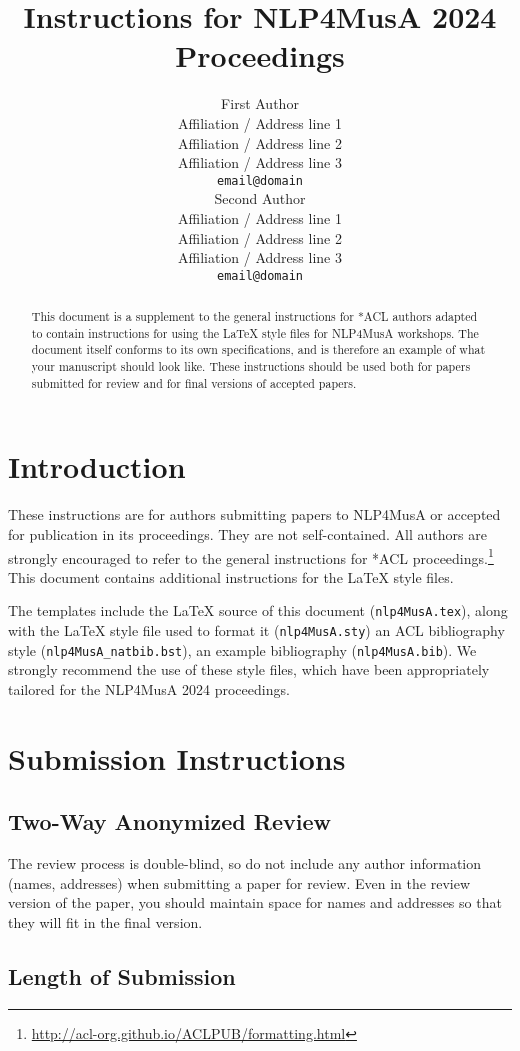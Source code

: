 \documentclass[11pt]{article}
\title{Instructions for NLP4MusA 2024 Proceedings}
\author{First Author \\
  Affiliation / Address line 1 \\
  Affiliation / Address line 2 \\ 
  Affiliation / Address line 3 \\
  \texttt{email@domain} \\\And
  Second Author \\
  Affiliation / Address line 1 \\
  Affiliation / Address line 2 \\
  Affiliation / Address line 3 \\
  \texttt{email@domain} \\}
\begin{document}
\maketitle
\begin{abstract}
This document is a supplement to the general instructions for *ACL authors adapted to contain instructions for using the \LaTeX{} style files for NLP4MusA workshops.
The document itself conforms to its own specifications, and is therefore an example of what your manuscript should look like.
These instructions should be used both for papers submitted for review and for final versions of accepted papers. 
\end{abstract}

\section{Introduction}

These instructions are for authors submitting papers to NLP4MusA or accepted for publication in its proceedings.
They are not self-contained. All authors are strongly encouraged to refer to the general instructions for *ACL proceedings.\footnote{\url{http://acl-org.github.io/ACLPUB/formatting.html}}
This document contains additional instructions for the \LaTeX{} style files.

The templates include the \LaTeX{} source of this document (\texttt{nlp4MusA.tex}),
along with the \LaTeX{} style file used to format it (\texttt{nlp4MusA.sty})
an ACL bibliography style (\texttt{nlp4MusA\_natbib.bst}),
an example bibliography (\texttt{nlp4MusA.bib}).
We strongly recommend the use of these style files, which have been appropriately tailored for the NLP4MusA 2024 proceedings.

\section{Submission Instructions}

\subsection{Two-Way Anonymized Review}
The review process is double-blind, so do not include any author information (names, addresses) when submitting a paper for review.  
Even in the review version of the paper, you should maintain space for names and addresses so that they will fit in the final version.

\subsection{Length of Submission}
\label{sec:length}
\end{document}
